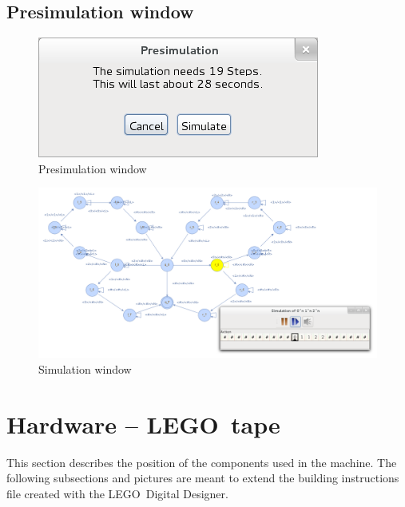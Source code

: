\documentclass[%
  a4paper,%
  11pt,%
  blue,%
  hyperref	%
  ]{tubsartcl}
\begin{document}
\newpage

\subsection{Presimulation window}

\begin{figure}[!htb]
\begin{center}
\includegraphics[scale=0.4]{graphics_gui/presimulation.png}
\end{center}
\caption{Presimulation window}
\label{pic:presimulation}
\end{figure}

\begin{figure}[!htb]
\begin{center}
\includegraphics[scale=0.35]{graphics_gui/simulation_window.png}
\end{center}
\caption{Simulation window}
\label{pic:simulation_window}
\end{figure}

\newpage

\section{Hardware -- LEGO\textregistered\, tape}

This section describes the position of the components used in the machine. The following subsections and pictures are meant to extend the building instructions file created with the LEGO\textregistered\, Digital Designer.
\end{document}
